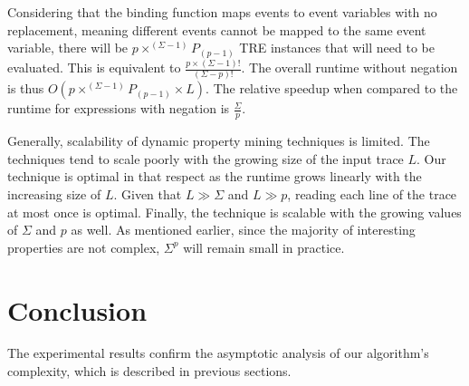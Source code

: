 \documentclass[]{sigplanconf}
\begin{document}
Considering that the binding function maps events to event variables with no replacement, meaning different events cannot be mapped to the same event variable, there will be $p \times ^{(\Sigma - 1)}P_{(p - 1)}$ TRE instances that will need to be evaluated. This is equivalent to $\frac{p \times (\Sigma - 1)!}{(\Sigma - p)!}$. The overall runtime without negation is thus
$O(p \times ^{(\Sigma - 1)}P_{(p - 1)} \times L)$. The relative speedup when compared to the runtime for expressions with negation is $\frac{\Sigma}{p}$.


Generally, scalability of dynamic property mining techniques is limited.
The techniques tend to scale poorly with the growing size of the input trace $L$. Our technique is optimal in that respect as the runtime grows linearly with the increasing size of $L$. Given that $L \gg \Sigma$ and $L \gg p$, reading each line of the trace at most once is optimal.
Finally, the technique is scalable with the growing values of $\Sigma$ and $p$ as well. As mentioned earlier, since the majority of interesting properties are not complex, $\Sigma^p$ will remain small in practice.

\section{Conclusion}

The experimental results confirm the asymptotic analysis of our algorithm's complexity, which is described in previous sections.


%


\end{document}
